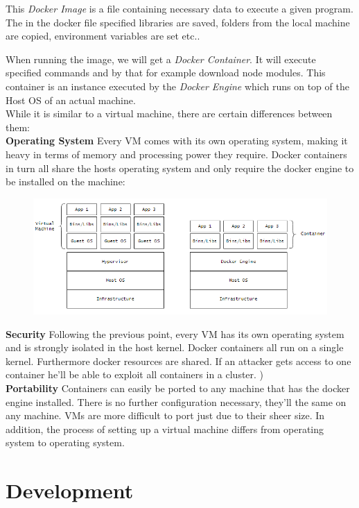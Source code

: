 This \emph{Docker Image} is a file containing necessary data to execute a given program. The in the docker file specified libraries are saved, folders from the local machine are copied, environment variables are set etc.. 

When running the image, we will get a \emph{Docker Container}. It will execute specified commands and by that for example download node modules. This container is an instance executed by the \emph{Docker Engine} which runs on top of the Host OS of an actual machine.
\\

While it is similar to a virtual machine, there are certain differences between them: \\
\textbf{Operating System} Every VM comes with its own operating system, making it heavy in terms of memory and processing power they require. Docker containers in turn all share the hosts operating system and only require the docker engine to be installed on the machine: \cite{GeekDocker}
\begin{figure}[H]
\centering
\includegraphics[scale=.8]{Bilder/DockerVsVM.png}
\label{ex312}
\end{figure}
\noindent
\textbf{Security} Following the previous point, every VM has its own operating system and is strongly isolated in the host kernel. Docker containers all run on a single kernel. Furthermore docker resources are shared. If an attacker gets access to one container he'll be able to exploit  all containers in a cluster. \cite{GeekDocker}) \\
\textbf{Portability} Containers can easily be ported to any machine that has the docker engine installed. There is no further configuration necessary, they'll the same on any machine. VMs are more difficult to port just due to their sheer size. In addition, the process of setting up a virtual machine differs from operating system to operating system. 

\chapter{Development}
